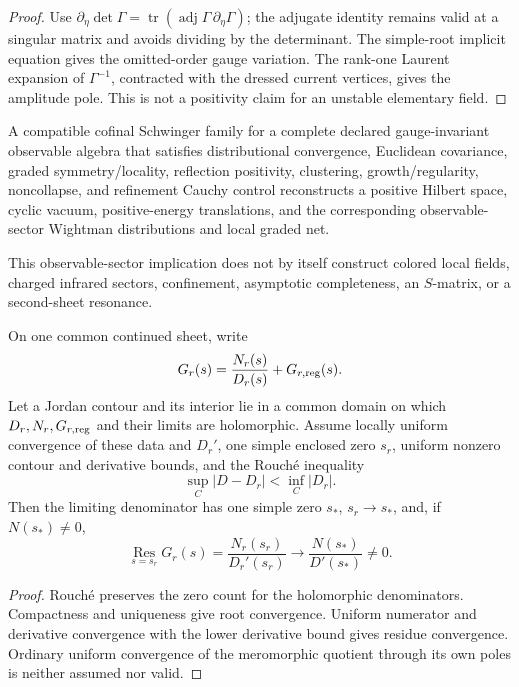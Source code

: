 \begin{proof}
Use
\(\partial_\eta\det\Gamma
=\operatorname{tr}(\operatorname{adj}\Gamma\,\partial_\eta\Gamma)\);
the adjugate identity remains valid at a singular matrix and avoids dividing
by the determinant. The simple-root implicit equation gives the
omitted-order gauge variation. The rank-one Laurent expansion of
\(\Gamma^{-1}\), contracted with the dressed current vertices, gives the
amplitude pole. This is not a positivity claim for an unstable elementary
field.
\end{proof}

\begin{theorem}
\label{thm:qft-q4-gauge-invariant-os}
A compatible cofinal Schwinger family for a complete declared
gauge-invariant observable algebra that satisfies distributional convergence,
Euclidean covariance, graded symmetry/locality, reflection positivity,
clustering, growth/regularity, noncollapse, and refinement Cauchy control
reconstructs a positive Hilbert space, cyclic vacuum, positive-energy
translations, and the corresponding observable-sector Wightman distributions
and local graded net.
\end{theorem}

\begin{remark}
This observable-sector implication does not by itself construct colored local
fields, charged infrared sectors, confinement, asymptotic completeness, an
\(S\)-matrix, or a second-sheet resonance.
\end{remark}

\begin{theorem}
\label{thm:qft-q4-resonance-stability}
On one common continued sheet, write
\[
G_r(s)=\frac{N_r(s)}{D_r(s)}+G_{r,\rm reg}(s).
\]
Let a Jordan contour and its interior lie in a common domain on which
\(D_r,N_r,G_{r,\rm reg}\) and their limits are holomorphic. Assume locally
uniform convergence of these data and \(D_r'\), one simple enclosed zero
\(s_r\), uniform nonzero contour and derivative bounds, and the Rouch\'e
inequality
\[
\sup_C|D-D_r|<\inf_C|D_r|.
\]
Then the limiting denominator has one simple zero \(s_*\), \(s_r\to s_*\),
and, if \(N(s_*)\ne0\),
\[
\operatorname*{Res}_{s=s_r}G_r(s)
=\frac{N_r(s_r)}{D_r'(s_r)}
\longrightarrow
\frac{N(s_*)}{D'(s_*)}\ne0.
\]
\end{theorem}

\begin{proof}
Rouch\'e preserves the zero count for the holomorphic denominators.
Compactness and uniqueness give root convergence. Uniform numerator and
derivative convergence with the lower derivative bound gives residue
convergence. Ordinary uniform convergence of the meromorphic quotient through
its own poles is neither assumed nor valid.
\end{proof}

